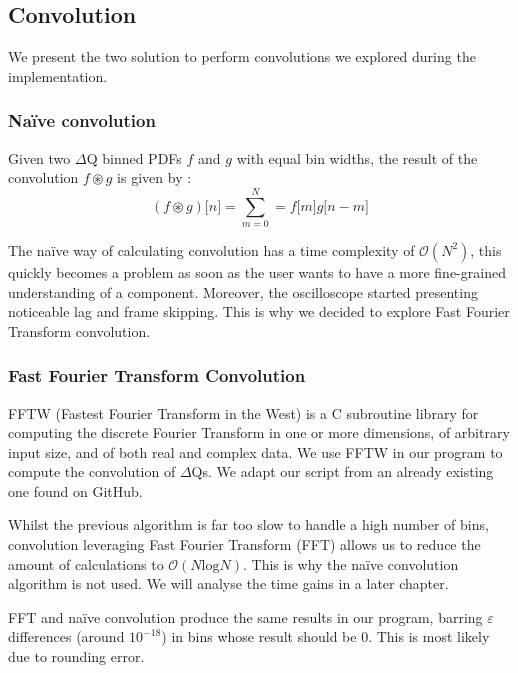     \subsection{Convolution} \label{convol}
    We present the two solution to perform convolutions we explored during the implementation.  
        \subsubsection{Naïve convolution}
        Given two $\Delta$Q binned PDFs $f$ and $g$ with equal bin widths, the result of the convolution $f \circledast g$ is given by \cite{conv}: 
        \begin{equation}
            (f \circledast g)\lbrack n \rbrack = \sum_{m = 0}^{N} = f\lbrack m \rbrack g \lbrack n - m \rbrack  
            \label{eq:discconv}
        \end{equation}

        The naïve way of calculating convolution has a time complexity of $\mathcal{O}(N^2)$, this quickly becomes a problem as soon as the user wants to have a more fine-grained understanding of a component. Moreover, the oscilloscope started presenting noticeable lag and frame skipping. This is why we decided to explore Fast Fourier Transform convolution. 
 
    \subsubsection{Fast Fourier Transform Convolution}
        FFTW (Fastest Fourier Transform in the West) is a C subroutine library \cite{fftw3} for computing the discrete Fourier Transform in one or more dimensions, of arbitrary input size, and of both real and complex data. We use FFTW in our program to compute the convolution of $\Delta$Qs. We adapt our script from an already existing one found on GitHub. \cite{fft}
    
    Whilst the previous algorithm is far too slow to handle a high number of bins, convolution leveraging Fast Fourier Transform (FFT) allows us to reduce the amount of calculations to $\mathcal{O}(N \text{log} N)$. This is why the naïve convolution algorithm is not used. We will analyse the time gains in a later chapter.
    
    FFT and naïve convolution produce the same results in our program, barring $\varepsilon$ differences (around $10^{-18}$) in bins whose result should be 0. This is most likely due to rounding error.
    
